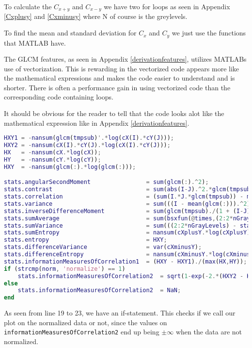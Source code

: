 To calculate the $C_{x+y}$ and $C_{x-y}$ we have two for loops as seen in Appendix \ref{Cxplusy} and \ref{Cxminusy} where N of course is the greylevels.

To find the mean and standard deviation for $C_x$ and $C_y$ we just use the functions that MATLAB have.

The GLCM features, as seen in Appendix \ref{derivationfeatures}, utilizes MATLABs use of vectorization. This is rewarding in the vectorized code appears more like the mathematical expressions and makes the code easier to understand and is shorter. There is often a performance gain in using vectorized code than the corresponding code containing loops.

It should be obvious for the reader to tell that the code looks alot like the mathematical expression like in Appendix \ref{derivationfeatures}.

\begin{lstlisting}[language=Matlab]
HXY1 = -nansum(glcm(tmpsub)'.*log(cX(I).*cY(J)));
HXY2 = -nansum(cX(I).*cY(J).*log(cX(I).*cY(J)));
HX   = -nansum(cX.*log(cX));
HY   = -nansum(cY.*log(cY));
HXY  = -nansum(glcm(:).*log(glcm(:)));

stats.angularSecondMoment                = sum(glcm(:).^2);
stats.contrast                           = sum(abs(I-J).^2.*glcm(tmpsub));
stats.correlation                        = (sum(I.*J.*glcm(tmpsub)) - muX*muY) ./ (stdX*stdY);
stats.variance                           = sum(((I - mean(glcm(:))).^2).*glcm(tmpsub));
stats.inverseDifferenceMoment            = sum(glcm(tmpsub)./(1 + (I-J).^2));
stats.sumAverage                         = sum(bsxfun(@times,(2:2*nGrayLevels)',cXplusY));
stats.sumVariance                        = sum(((2:2*nGrayLevels) - stats.sumAverage)'.^2.*cXplusY((2:2*nGrayLevels)-1,1));
stats.sumEntropy                         = nansum(cXplusY.*log(cXplusY));
stats.entropy                            = HXY;
stats.differenceVariance                 = var(cXminusY);
stats.differenceEntropy                  = nansum(cXminusY.*log(cXminusY));
stats.informationMeasuresOfCorrelation1  = (HXY - HXY1)./(max(HX,HY));
if (strcmp(norm, 'normalize') == 1)
    stats.informationMeasuresOfCorrelation2  = sqrt(1-exp(-2.*(HXY2 - HXY)));
else
    stats.informationMeasuresOfCorrelation2  = NaN;
end
\end{lstlisting}


As seen from line 19 to 23, we have an if-statement. This checks if we call our plot on the normalized data or not, since the values on \texttt{informationMeasuresOfCorrelation2} end up being $\pm \infty$ when the data are not normalized. 


